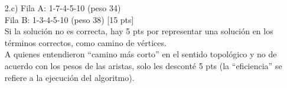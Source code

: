 \documentclass[letter,12pt,oneside]{book}
\theoremstyle{definition}
\begin{document}
\begin{enumerate}
    \item[2.c)] Fila A: 1-7-4-5-10 (peso 34)\\
    Fila B: 1-3-4-5-10 (peso 38)\tabto{86ex} [15 pts]\\
    Si la solución no es correcta, hay 5 pts por representar una solución en los términos correctos, como camino de vértices.\\
    A quienes entendieron ``camino más corto'' en el sentido topológico y no de acuerdo con los pesos de las aristas, solo les desconté 5 pts (la ``eficiencia'' se refiere a la ejecución del algoritmo).

\end{enumerate}
\end{document}
